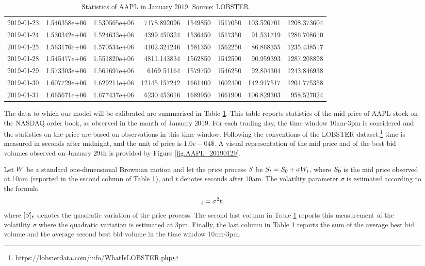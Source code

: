 \documentclass[10pt,a4paper]{article}
\begin{document}
\begin{table}
\begin{tiny}
{\begin{tabular}{lrrrrrrr}
					2019-01-23 &   1.546358e+06 &  1.530565e+06 &   7178.892096 &  1549850   &  1517050   &     103.526701 &  1208.373604 \\
					2019-01-24 &   1.530342e+06 &  1.524633e+06 &   4399.450324 &  1536450   &  1517350   &    91.531719 &  1286.708610 \\
					2019-01-25 &   1.563176e+06 &  1.570534e+06 &   4102.321246 &  1581350   &  1562250   &      86.868355 &  1235.438517 \\
					2019-01-28 &   1.545477e+06 &  1.551820e+06 &   4811.143834 &  1562850   &  1542500   &      90.959393 &  1287.208898 \\
					2019-01-29 &   1.573303e+06 &  1.561697e+06 &   6169  51164 &  1579750   &  1546250   &      92.804304 &  1243.846938 \\
					2019-01-30 &   1.607729e+06 &  1.629211e+06 &  12145.157242 &  1661400   &  1602400   &     142.917517 &  1201.775358 \\
					2019-01-31 &    1.665671e+06 &  1.677437e+06 &   6230.453616 &  1689950 &  1661900 &             106.829303 &   958.527024
					\\
				\end{tabular}
			}
		\end{tiny}
		\caption{{Statistics of AAPL in January 2019. Source: LOBSTER}}
		\label{tab.statAAPLjanuary2019}
	\end{table}
	
	The data to which our model will be calibrated are summarised in Table \ref{tab.statAAPLjanuary2019}. This table reports statistics of the mid price of AAPL stock on the NASDAQ order book, as observed in the month of January 2019. For each trading day, the time window 10am-3pm is considered and the statistics on the price are based on observations in this time window. Following the conventions of the LOBSTER dataset,\footnote{https://lobsterdata.com/info/WhatIsLOBSTER.php} time is measured in seconds after midnight, and the unit of price is $1.0e-04\$$. A visual representation of the mid price and of the best bid volumes observed on January 29th is provided by Figure \ref{fig.AAPL_20190129}.
	
	Let $W$ be a standard one-dimensional Brownian motion and let the price process $S$ be $S_t = S_0 + \sigma W_t$, where $S_0$ is the mid price observed at 10am (reported in the second column of Table \ref{tab.statAAPLjanuary2019}), and $t$ denotes seconds after 10am. The volatility parameter $\sigma$ is estimated according to the formula 
	\begin{equation*}
	[\fundamentalPrice]_t = \sigma\squared t,
	\end{equation*}
	where $[S]_t$ denotes the quadratic variation of the price process. The second last column in Table \ref{tab.statAAPLjanuary2019} reports this measurement of the volatility $\sigma$ where the quadratic variation is estimated at 3pm. Finally, the last column in Table \ref{tab.statAAPLjanuary2019} reports the sum of the average best bid volume and the average second best bid volume in the time window 10am-3pm.  
	
\end{document}
